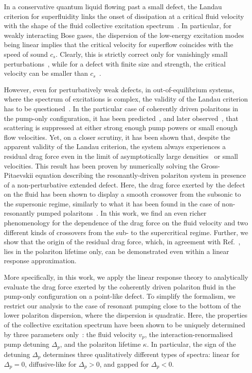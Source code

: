 In a conservative quantum liquid flowing past a small defect, the
Landau criterion for superfluidity links the onset of dissipation at a
critical fluid velocity with the shape of the fluid collective
excitation spectrum~\cite{9780198507192}. In particular, for weakly
interacting Bose gases, the dispersion of the low-energy excitation
modes being linear implies that the critical velocity for superflow
coincides with the speed of sound $c_s$. Clearly, this is strictly
correct only for vanishingly small
perturbations~\cite{Astrakharchik_2004}, while for a defect with finite
size and strength, the critical velocity can be smaller than
$c_s$~\cite{Onofrio_2000,Ianeselli_2006}.

However, even for perturbatively weak defects, in out-of-equilibrium
systems, where the spectrum of excitations is complex, the validity of
the Landau criterion has to be
questioned~\cite{Szyma_ska_2006,Wouters_2010,Cancellieri_2010}. In the
particular case of coherently driven polaritons in the pump-only
configuration, it has been predicted~\cite{Carusotto_2004,Ciuti_2005}, and
later observed~\cite{Amo_2009}, that scattering is suppressed at either
strong enough pump powers or small enough flow velocities. Yet, on a
closer scrutiny, it has been shown that, despite the apparent validity
of the Landau criterion, the system always experiences a residual drag
force even in the limit of asymptotically large
densities~\cite{Cancellieri_2010} or small velocities. This result has
been proven by numerically solving the Gross-Pitaevskii equation
describing the resonantly-driven polariton system in presence of a
non-perturbative extended defect. Here, the drag force exerted by the
defect on the fluid has been shown to display a smooth crossover from
the subsonic to the supersonic regime, similarly to what it has been
found in the case of non-resonantly pumped
polaritons~\cite{Wouters_2010}. In this work, we find an even richer
phenomenology for the dependence of the drag force on the fluid
velocity and two different kinds of crossovers from the sub- to the
supercritical regime. Further, we show that the origin of the residual
drag force, which, in agreement with Ref.~\cite{Cancellieri_2010}, lies
in the polariton lifetime only, can be demonstrated even within a
linear response approximation.

More specifically, in this work, we apply the linear response theory
to analytically evaluate the drag force exerted by the coherently
driven polariton fluid in the pump-only configuration on a point-like
defect. To simplify the formalism, we restrict our analysis to the
case of resonant pumping close to the bottom of the lower polariton
dispersion, where the dispersion is quadratic. Here, the properties of
the collective excitation spectrum have been shown to be uniquely
determined by three parameters only~\cite{Ciuti_2005}: the fluid
velocity $v_p$, the interaction-renormalised pump detuning $\Delta_p$,
and the polariton lifetime $\kappa$. In particular, the sign of the
detuning $\Delta_p$ determines three qualitatively different types of
spectra: linear for $\Delta_p= 0$, diffusive-like for $\Delta_p> 0$,
and gapped for $\Delta_p< 0$. 

